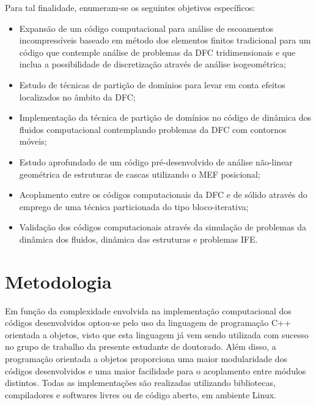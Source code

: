 \documentclass[tese_patricia.tex]{subfiles}
\begin{document}
Para tal finalidade, enumeram-se os seguintes objetivos específicos:

\begin{itemize}
	\item Expansão de um código computacional para análise de escoamentos incompressíveis baseado em método dos elementos finitos tradicional para um código que contemple análise de problemas da DFC tridimensionais e que inclua a possibilidade de discretização através de análise isogeométrica;
	
	\item Estudo de técnicas de partição de domínios para levar em conta efeitos localizados no âmbito da DFC;
	
	\item Implementação da técnica de partição de domínios no código de dinâmica dos fluidos computacional contemplando problemas da DFC com contornos móveis;
	
	\item Estudo aprofundado de um código pré-desenvolvido de análise não-linear geométrica de estruturas de cascas utilizando o MEF posicional;
	
	\item Acoplamento entre os códigos computacionais da DFC e de sólido através do emprego de uma técnica particionada do tipo bloco-iterativa;
	
	\item  Validação dos códigos computacionais através da simulação de problemas da dinâmica dos fluidos, dinâmica das estruturas e problemas IFE.
	
\end{itemize}

\section[Metodologia]{Metodologia} 
Em função da complexidade envolvida na implementação computacional dos códigos desenvolvidos optou-se pelo uso da linguagem de programação C++ orientada a objetos, visto que esta linguagem já vem sendo utilizada com sucesso no grupo de trabalho da presente estudante de doutorado. Além disso, a programação orientada a objetos proporciona uma maior modularidade dos códigos desenvolvidos e uma maior facilidade para o acoplamento entre módulos distintos.  Todas as implementações são realizadas utilizando bibliotecas, compiladores e softwares livres ou de código aberto, em ambiente Linux.
\end{document}
